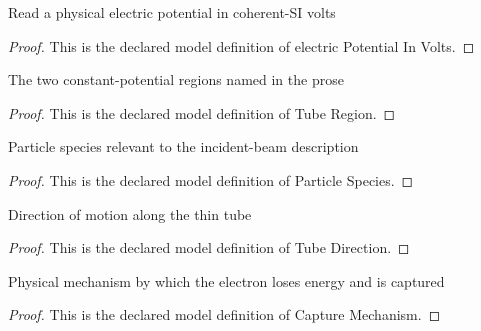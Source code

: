 \begin{definition}
  \label{def:physics:phyx-mini-0585:phyxminiproblems-problemphyxmini0585-electricpotentialinvolts}
  Read a physical electric potential in coherent-SI volts
\end{definition}
\begin{proof}
  This is the declared model definition of electric Potential In Volts.
\end{proof}
\begin{definition}
  \label{def:physics:phyx-mini-0585:phyxminiproblems-problemphyxmini0585-tuberegion}
  The two constant-potential regions named in the prose
\end{definition}
\begin{proof}
  This is the declared model definition of Tube Region.
\end{proof}
\begin{definition}
  \label{def:physics:phyx-mini-0585:phyxminiproblems-problemphyxmini0585-particlespecies}
  Particle species relevant to the incident-beam description
\end{definition}
\begin{proof}
  This is the declared model definition of Particle Species.
\end{proof}
\begin{definition}
  \label{def:physics:phyx-mini-0585:phyxminiproblems-problemphyxmini0585-tubedirection}
  Direction of motion along the thin tube
\end{definition}
\begin{proof}
  This is the declared model definition of Tube Direction.
\end{proof}
\begin{definition}
  \label{def:physics:phyx-mini-0585:phyxminiproblems-problemphyxmini0585-capturemechanism}
  Physical mechanism by which the electron loses energy and is captured
\end{definition}
\begin{proof}
  This is the declared model definition of Capture Mechanism.
\end{proof}
